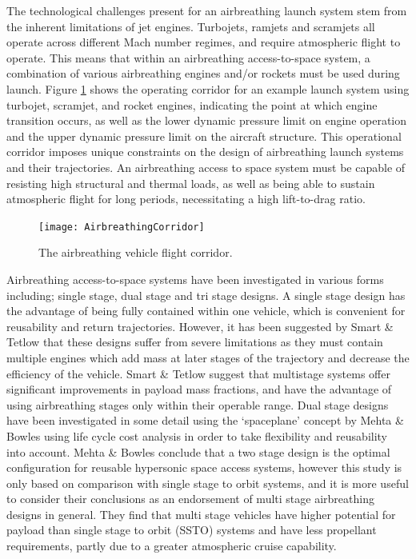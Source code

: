    The technological challenges present for an airbreathing launch system stem from the inherent limitations of jet engines. Turbojets, ramjets and scramjets all operate across different Mach number regimes, and require atmospheric flight to operate\cite{Smart2009}. 
    This means that within an airbreathing access-to-space system, a combination of various airbreathing engines and/or rockets must be used during launch.
    Figure \ref{fig:AirbreathingCorridor} shows the operating corridor for an example launch system using turbojet, scramjet, and rocket engines, indicating the point at which engine transition occurs, as well as the lower dynamic pressure limit on engine operation and the upper dynamic pressure limit on the aircraft structure.
    This operational corridor imposes unique constraints on the design of airbreathing launch systems and their trajectories. An airbreathing access to space system must be capable of resisting high structural and thermal loads, as well as being able to sustain atmospheric flight for long periods, necessitating a high lift-to-drag ratio. 
    \begin{figure}[ht]
    	\centering
    	\texttt{[image: AirbreathingCorridor]}
    	\caption{The airbreathing vehicle flight corridor\cite{Smart2010}.}
    	\label{fig:AirbreathingCorridor}
    \end{figure}
    

    
    
Airbreathing access-to-space systems have been investigated in various forms including; single stage\cite{Powell1991,Wilhite1991,Varvill2008,Trefny1999,Roche2000,Young2006,Bradford2000}, dual stage\cite{Tsuchiya2005,Mehta2001,Gong2014} and tri stage\cite{Preller2017b} designs. 
  A single stage design has the advantage of being fully contained within one vehicle, which is convenient for reusability and return trajectories. However, it has been suggested by Smart \& Tetlow\cite{Smart2009} that these designs suffer from severe limitations as they must contain multiple engines which add mass at later stages of the trajectory and decrease the efficiency of the vehicle. Smart \& Tetlow suggest that multistage systems offer significant improvements in payload mass fractions, and have the advantage of using airbreathing stages only within their operable range.
  Dual stage designs have been investigated in some detail using the `spaceplane' concept by Mehta \& Bowles\cite{Mehta2001} using life cycle cost analysis in order to take flexibility and reusability into account. Mehta \& Bowles conclude that a two stage design is the optimal configuration for reusable hypersonic space access systems, however this study is only based on comparison with single stage to orbit systems, and it is more useful to consider their conclusions as an endorsement of multi stage airbreathing designs in general. They find that multi stage vehicles have higher potential for payload than single stage to orbit (SSTO) systems and have less propellant requirements, partly due to a greater atmospheric cruise capability. 
 
